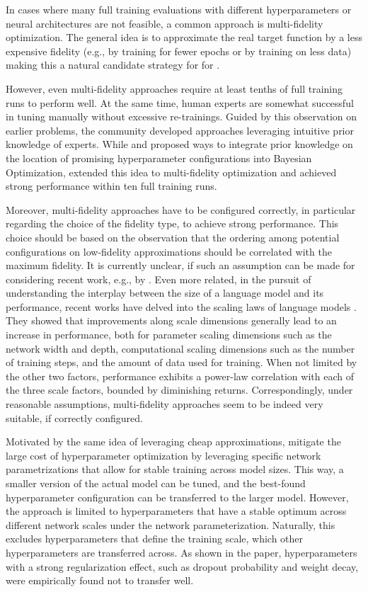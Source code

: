 \documentclass[10pt]{article} %
\begin{document}
In cases where many full training evaluations with different hyperparameters or neural architectures are not feasible, a common \AutoML approach is multi-fidelity optimization. The general idea is to approximate the real target function by a less expensive fidelity (e.g., by training for fewer epochs or by training on less data) making this a natural candidate strategy for \HPO for \LLMs.

However, even multi-fidelity approaches require at least tenths of full training runs to perform well. At the same time, human experts are somewhat successful in tuning \LLMs manually without excessive re-trainings. Guided by this observation on earlier \AutoML problems, the community developed approaches leveraging intuitive prior knowledge of experts. While \cite{souza-ecmlpkdd21a} and \cite{hvarfner-iclr22a} proposed ways to integrate prior knowledge on the location of promising hyperparameter configurations into Bayesian Optimization, \cite{mallik-neurips23a} extended this idea to multi-fidelity optimization and achieved strong performance within ten full training runs.

Moreover, multi-fidelity approaches have to be configured correctly, in particular regarding the choice of the fidelity type, to achieve strong performance. This choice should be based on the observation that the ordering among potential configurations on low-fidelity approximations should be correlated with the maximum fidelity. It is currently unclear, if such an assumption can be made for \LLMs considering recent work, e.g., by \citet{kirsch-arxiv22a}.
Even more related, in the pursuit of understanding the interplay between the size of a language model and its performance, recent works have delved into the scaling laws of language models \citep{radford-openai19a, brown-neurips20a, kaplan-arxiv2020a}. 
They showed that improvements along scale dimensions generally lead to an increase in performance, both for parameter scaling dimensions such as the network width and depth, computational scaling dimensions such as the number of training steps, and the amount of data used for training.
When not limited by the other two factors, performance exhibits a power-law correlation with each of the three scale factors, bounded by diminishing returns. Correspondingly, under reasonable assumptions, multi-fidelity approaches seem to be indeed very suitable, if correctly configured.

Motivated by the same idea of leveraging cheap approximations, \citet{yang-neurips21a} mitigate the large cost of \LLM hyperparameter optimization by leveraging specific network parametrizations that allow for stable training across model sizes. 
This way, a smaller version of the actual model can be tuned, and the best-found hyperparameter configuration can be transferred to the larger model. 
However, the approach is limited to hyperparameters that have a stable optimum across different network scales under the network parameterization. 
Naturally, this excludes hyperparameters that define the training scale, which other hyperparameters are transferred across.
As shown in the paper, hyperparameters with a strong regularization effect, such as dropout probability and weight decay, were empirically found not to transfer well.
\end{document}
